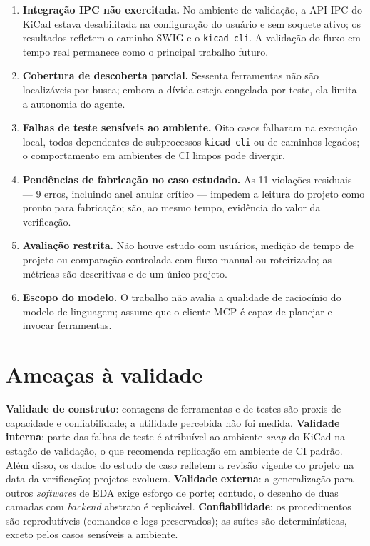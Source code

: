 \begin{enumerate}[leftmargin=1.4em,itemsep=0.25em]
  \item \textbf{Integração IPC não exercitada.} No ambiente de validação, a
        API IPC do KiCad estava desabilitada na configuração do usuário e sem
        soquete ativo; os resultados refletem o caminho SWIG e o
        \texttt{kicad-cli}. A validação do fluxo em tempo real permanece como
        o principal trabalho futuro.
  \item \textbf{Cobertura de descoberta parcial.} Sessenta ferramentas não
        são localizáveis por busca; embora a dívida esteja congelada por
        teste, ela limita a autonomia do agente.
  \item \textbf{Falhas de teste sensíveis ao ambiente.} Oito casos falharam
        na execução local, todos dependentes de subprocessos
        \texttt{kicad-cli} ou de caminhos legados; o comportamento em
        ambientes de CI limpos pode divergir.
  \item \textbf{Pendências de fabricação no caso estudado.} As 11 violações
        residuais --- 9 erros, incluindo anel anular crítico --- impedem a
        leitura do projeto como pronto para fabricação; são, ao mesmo tempo,
        evidência do valor da verificação.
  \item \textbf{Avaliação restrita.} Não houve estudo com usuários, medição
        de tempo de projeto ou comparação controlada com fluxo manual ou
        roteirizado; as métricas são descritivas e de um único projeto.
  \item \textbf{Escopo do modelo.} O trabalho não avalia a qualidade de
        raciocínio do modelo de linguagem; assume que o cliente MCP é capaz
        de planejar e invocar ferramentas.
\end{enumerate}

\section{Ameaças à validade}

\textbf{Validade de construto}: contagens de ferramentas e de testes são
proxis de capacidade e confiabilidade; a utilidade percebida não foi medida.
\textbf{Validade interna}: parte das falhas de teste é atribuível ao ambiente
\emph{snap} do KiCad na estação de validação, o que recomenda replicação em
ambiente de CI padrão. Além disso, os dados do estudo de caso refletem a
revisão vigente do projeto na data da verificação; projetos evoluem.
\textbf{Validade externa}: a generalização para outros \emph{softwares} de
EDA exige esforço de porte; contudo, o desenho de duas camadas com
\emph{backend} abstrato é replicável. \textbf{Confiabilidade}: os
procedimentos são reprodutíveis (comandos e logs preservados); as suítes são
determinísticas, exceto pelos casos sensíveis a ambiente.

